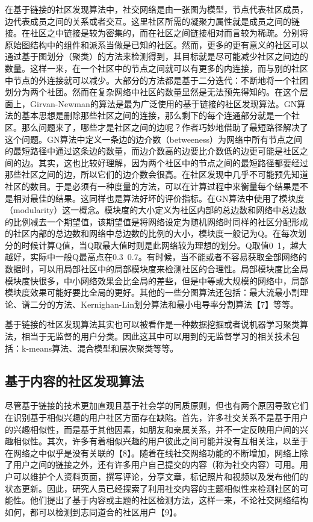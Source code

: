 在基于链接的社区发现算法中，社交网络是由一张图为模型，节点代表社区成员，边代表成员之间的关系或者交互。这里社区所需的凝聚力属性就是成员之间的链接。在社区之中链接是较为密集的，而在社区之间链接相对而言较为稀疏。分别将原始图结构中的组件和派系当做是已知的社区\cite{Fortunato2009Community}。然而，更多的更有意义的社区可以通过基于图划分（聚类）的方法来检测得到，其目标就是尽可能减少社区之间边的数量。这样一来，在一个社区中的节点之间就可以有更多的内连接，而与别的社区中节点的外连接就可以减少。大部分的方法都是基于二分迭代：不断地将一个社团划分为两个社团。然而在复杂网络中社区的数量显然是无法预先得知的。在这个层面上，Girvan-Newman的算法是最为广泛使用的基于链接的社区发现算法\cite{2002Community}。GN算法的基本思想是删除那些社区之间的连接，那么剩下的每个连通部分就是一个社区。那么问题来了，哪些才是社区之间的边呢？作者巧妙地借助了最短路径解决了这个问题。GN算法中定义一条边的边介数（betweeness）为网络中所有节点之间的最短路径中通过这条边的数量，而边介数高的边要比介数低的边更可能是社区之间的边。其实，这也比较好理解，因为两个社区中的节点之间的最短路径都要经过那些社区之间的边，所以它们的边介数会很高。在社区发现中几乎不可能预先知道社区的数目。于是必须有一种度量的方法，可以在计算过程中来衡量每个结果是不是相对最佳的结果。这同样也是算法好坏的评价指标。在GN算法中使用了模块度（modularity）这一概念。模块度的大小定义为社区内部的总边数和网络中总边数的比例减去一个期望值，该期望值是将网络设定为随机网络时同样的社区分配形成的社区内部的总边数和网络中总边数的比例的大小，模块度一般记为Q。在每次划分的时候计算Q值，当Q取最大值时则是此网络较为理想的划分。Q取值0~1，越大越好，实际中一般Q最高点在0.3~0.7。有时候，当不能或者不容易获取全部网络的数据时，可以用局部社区中的局部模块度来检测社区的合理性。局部模块度比全局模块度快很多，中小网络效果会比全局的差些，但是中等或大规模的网络中，局部模块度效果可能好要比全局的更好。其他的一些分图算法还包括：最大流最小割理论\cite{Jr2009Maximal}、谱二分的方法\cite{Pothen1990Partitioning}、Kernighan-Lin划分算法\cite{Kernigan1970An}和最小电导率分割算法【7】等等。

基于链接的社区发现算法其实也可以被看作是一种数据挖掘或者说机器学习聚类算法，相当于无监督的用户分类。因此这其中可以用到的无监督学习的相关技术包括：k-means算法、混合模型和层次聚类等等。

\subsection{基于内容的社区发现算法}
尽管基于链接的技术更加直观且基于社会学的同质原则，但也有两个原因导致它们在识别基于相似兴趣的用户社区方面存在缺陷。首先，许多社交关系不是基于用户的兴趣相似性，而是基于其他因素，如朋友和亲属关系，并不一定反映用户间的兴趣相似性。其次，许多有着相似兴趣的用户彼此之间可能并没有互相关注，以至于在网络之中似乎是没有关联的【8】。随着在线社交网络功能的不断增加，网络上除了用户之间的链接之外，还有许多用户自己提交的内容（称为社交内容）可用。用户可以维护个人资料页面，撰写评论，分享文章，标记照片和视频以及发布他们的状态更新。因此，研究人员已经探索了利用社交内容的主题相似性来检测社区的可能性。他们提出了基于内容或主题的社区检测方法，这样一来，不论社交网络结构如何，都可以检测到志同道合的社区用户【9】。

